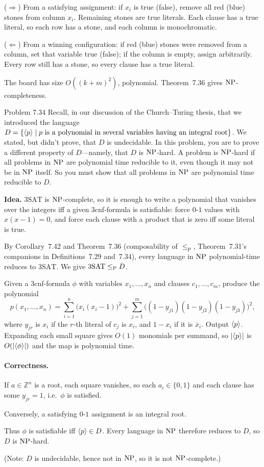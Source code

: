\begin{soln}
($\Rightarrow$) From a satisfying assignment: if $x_i$ is true (false), remove all red (blue) stones from column $x_i$. Remaining stones are true literals. Each clause has a true literal, so each row has a stone, and each column is monochromatic.

($\Leftarrow$) From a winning configuration: if red (blue) stones were removed from a column, set that variable true (false); if the column is empty, assign arbitrarily. Every row still has a stone, so every clause has a true literal.

The board has size $O((k+m)^2)$, polynomial. Theorem~7.36 gives $\mathrm{NP}$-completeness.
\end{soln}

\begin{question}{Problem 7.34}
Recall, in our discussion of the Church--Turing thesis, that we introduced the language $D=\{\langle p\rangle\mid p\text{ is a polynomial in several variables having an integral root}\}$. We stated, but didn't prove, that $D$ is undecidable. In this problem, you are to prove a different property of $D$---namely, that $D$ is $\mathrm{NP}$-hard. A problem is $\mathrm{NP}$-hard if all problems in $\mathrm{NP}$ are polynomial time reducible to it, even though it may not be in $\mathrm{NP}$ itself. So you must show that all problems in $\mathrm{NP}$ are polynomial time reducible to $D$.
\end{question}
\begin{soln}
\textbf{Idea.} $3\mathrm{SAT}$ is $\mathrm{NP}$-complete, so it is enough to write a polynomial that vanishes over the integers iff a given $3$cnf-formula is satisfiable: force $0$-$1$ values with $x(x-1)=0$, and force each clause with a product that is zero iff some literal is true.

By Corollary~7.42 and Theorem~7.36 (composability of $\le_{\mathrm{P}}$, Theorem~7.31's companions in Definitions~7.29 and~7.34), every language in $\mathrm{NP}$ polynomial-time reduces to $3\mathrm{SAT}$. We give $3\mathrm{SAT}\le_{\mathrm{P}} D$.

Given a $3$cnf-formula $\phi$ with variables $x_1,\dots,x_n$ and clauses $c_1,\dots,c_m$, produce the polynomial
\[
p(x_1,\dots,x_n)
=\sum_{i=1}^n \bigl(x_i(x_i-1)\bigr)^2
+\sum_{j=1}^m \bigl((1-y_{j1})(1-y_{j2})(1-y_{j3})\bigr)^2,
\]
where $y_{jr}$ is $x_i$ if the $r$-th literal of $c_j$ is $x_i$, and $1-x_i$ if it is $\overline{x}_i$. Output $\langle p\rangle$. Expanding each small square gives $O(1)$ monomials per summand, so $|\langle p\rangle|$ is $O(|\langle \phi\rangle|)$ and the map is polynomial time.

\paragraph{Correctness.}
If $a\in\mathbb{Z}^n$ is a root, each square vanishes, so each $a_i\in\{0,1\}$ and each clause has some $y_{jr}=1$, i.e.\ $\phi$ is satisfied.

Conversely, a satisfying $0$-$1$ assignment is an integral root.

Thus $\phi$ is satisfiable iff $\langle p\rangle\in D$. Every language in $\mathrm{NP}$ therefore reduces to $D$, so $D$ is $\mathrm{NP}$-hard.

(Note: $D$ is undecidable, hence not in $\mathrm{NP}$, so it is not $\mathrm{NP}$-complete.)
\end{soln}

